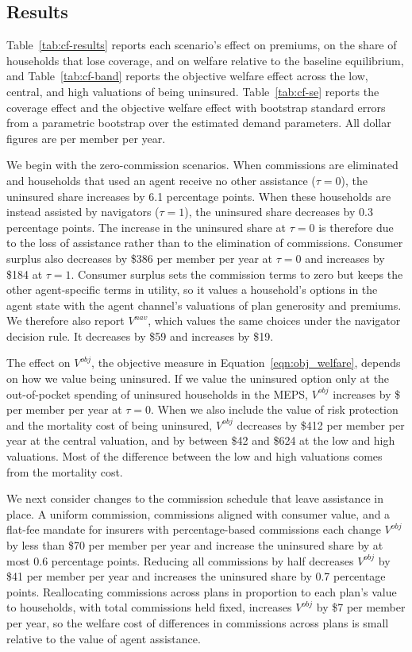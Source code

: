 \documentclass[12pt]{article}
\begin{document}
\subsection{Results}
\label{subsec:welfare_results}

Table~\ref{tab:cf-results} reports each scenario's effect on premiums, on the share of households that lose coverage, and on welfare relative to the baseline equilibrium, and Table~\ref{tab:cf-band} reports the objective welfare effect across the low, central, and high valuations of being uninsured. Table~\ref{tab:cf-se} reports the coverage effect and the objective welfare effect with bootstrap standard errors from a parametric bootstrap over the estimated demand parameters. All dollar figures are per member per year.

We begin with the zero-commission scenarios. When commissions are eliminated and households that used an agent receive no other assistance ($\tau = 0$), the uninsured share increases by 6.1 percentage points. When these households are instead assisted by navigators ($\tau = 1$), the uninsured share decreases by 0.3 percentage points. The increase in the uninsured share at $\tau = 0$ is therefore due to the loss of assistance rather than to the elimination of commissions. Consumer surplus also decreases by \$386 per member per year at $\tau = 0$ and increases by \$184 at $\tau = 1$. Consumer surplus sets the commission terms to zero but keeps the other agent-specific terms in utility, so it values a household's options in the agent state with the agent channel's valuations of plan generosity and premiums. We therefore also report $V^{nav}$, which values the same choices under the navigator decision rule. It decreases by \$59 and increases by \$19.

The effect on $V^{obj}$, the objective measure in Equation~\eqref{eqn:obj_welfare}, depends on how we value being uninsured. If we value the uninsured option only at the out-of-pocket spending of uninsured households in the MEPS, $V^{obj}$ increases by \$\cfZeroObjOOP{} per member per year at $\tau = 0$. When we also include the value of risk protection and the mortality cost of being uninsured, $V^{obj}$ decreases by \$412 per member per year at the central valuation, and by between \$42 and \$624 at the low and high valuations. Most of the difference between the low and high valuations comes from the mortality cost.


We next consider changes to the commission schedule that leave assistance in place. A uniform commission, commissions aligned with consumer value, and a flat-fee mandate for insurers with percentage-based commissions each change $V^{obj}$ by less than \$70 per member per year and increase the uninsured share by at most 0.6 percentage points. Reducing all commissions by half decreases $V^{obj}$ by \$41 per member per year and increases the uninsured share by 0.7 percentage points. Reallocating commissions across plans in proportion to each plan's value to households, with total commissions held fixed, increases $V^{obj}$ by \$7 per member per year, so the welfare cost of differences in commissions across plans is small relative to the value of agent assistance.
\end{document}
